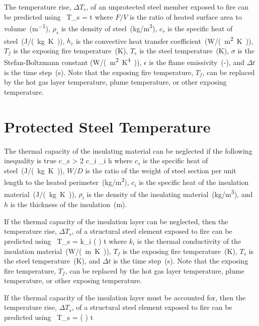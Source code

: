 The temperature rise, $\Delta T_s$, of an unprotected steel member exposed to fire can be predicted using~\cite{Buchanan:1}
\be
\Delta T_s =    \Delta t
\label{eq:unprotected_steel}
\ee
where $F/V$ is the ratio of heated surface area to volume~(\si{m^{-1}}), $\rho_s$ is the density of steel~(\si{kg/m^3}), $c_s$ is the specific heat of steel~(\si{J/(kg.K)}), $h_c$ is the convective heat transfer coefficient~(\si{W/(m^2.K)}), $T_f$ is the exposing fire temperature~(\si{K}), $T_s$ is the steel temperature~(\si{K}), $\sigma$ is the Stefan-Boltzmann constant (\si{W/(m^2.K^4)}), $\epsilon$ is the flame emissivity~(-), and $\Delta t$ is the time step~(\si{s}). Note that the exposing fire temperature, $T_f$, can be replaced by the hot gas layer temperature, plume temperature, or other exposing temperature.


\section{Protected Steel Temperature}
\label{info:protected_steel_temperature}

The thermal capacity of the insulating material can be neglected if the following inequality is true
\be
c_s  > 2 c_i \rho_i h
\ee
where $c_s$ is the specific heat of steel~(\si{J/(kg.K)}), $W/D$ is the ratio of the weight of steel section per unit length to the heated perimeter~(\si{kg/m^2}), $c_i$ is the specific heat of the insulation material~(\si{J/(kg.K)}), $\rho_i$ is the density of the insulating material~(\si{kg/m^3}), and $h$ is the thickness of the insulation~(\si{m}).

If the thermal capacity of the insulation layer can be neglected, then the temperature rise, $\Delta T_s$, of a structural steel element exposed to fire can be predicted using~\cite{Buchanan:1}
\be
\Delta T_s = k_i \left(  \right) \Delta t
\label{eq:protected_steel_neglect_c}
\ee
where $k_i$ is the thermal conductivity of the insulation material~(\si{W/(m.K)}), $T_f$ is the exposing fire temperature~(\si{K}), $T_s$ is the steel temperature~(\si{K}), and $\Delta t$ is the time step~(\si{s}). Note that the exposing fire temperature, $T_f$, can be replaced by the hot gas layer temperature, plume temperature, or other exposing temperature.

If the thermal capacity of the insulation layer must be accounted for, then the temperature rise, $\Delta T_s$, of a structural steel element exposed to fire can be predicted using~\cite{Buchanan:1}
\be
\Delta T_s =  \left(  \right) \Delta t
\label{eq:protected_steel_account_c}
\ee

